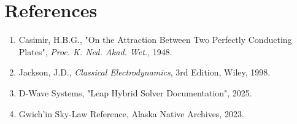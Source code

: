 \documentclass[12pt]{article}
\begin{document}
\section{References}
\begin{enumerate}
    \item Casimir, H.B.G., "On the Attraction Between Two Perfectly Conducting Plates", \textit{Proc. K. Ned. Akad. Wet.}, 1948.
    \item Jackson, J.D., \textit{Classical Electrodynamics}, 3rd Edition, Wiley, 1998.
    \item D-Wave Systems, "Leap Hybrid Solver Documentation", 2025.
    \item Gwich’in Sky-Law Reference, Alaska Native Archives, 2023.
\end{enumerate}
\end{document}

